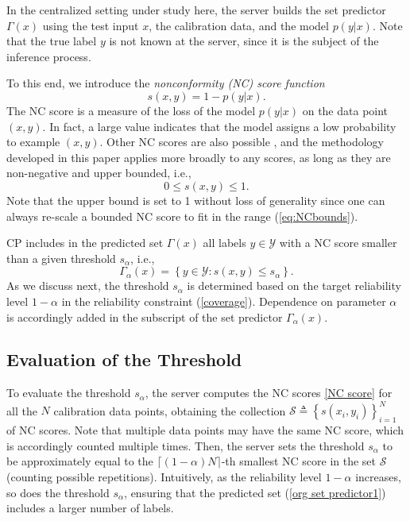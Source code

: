 \documentclass[12pt, draftclsnofoot, onecolumn]{IEEEtran}
\begin{document}
In the centralized setting under study here, the server builds the set predictor $\Gamma(x)$ using the test input $x$, the calibration data, and the model $p(y|x)$. Note that the true label $y$ is not known at the server, since it is the subject of the inference process. 


To this end, we introduce the \emph{nonconformity (NC) score function} 
\begin{equation}\label{NC score}
    s(x,y) = 1 - p(y|x).
\end{equation}
The NC score is a measure of the loss of the model $p(y|x)$ on the data point $(x,y)$. In fact, a large value indicates that the model assigns a low probability to example $(x,y)$. Other NC scores are also possible \cite{romano2020classification, wang2022probabilistic, teng2022predictive, chen2023spikecp}, and the methodology developed in this paper applies more broadly to any scores, as long as they are non-negative and upper bounded, i.e.,
\begin{equation}\label{eq:NCbounds}
    0\leq s(x,y)\leq 1.
\end{equation}
Note that the upper bound is set to 1 without loss of generality since one can always re-scale a bounded NC score to fit in the range (\ref{eq:NCbounds}).


CP includes in the predicted set $\Gamma(x)$ all labels $y\in \mathcal{Y}$ with a NC score smaller than a given threshold $s_\alpha$, i.e.,
\begin{equation}\label{org set predictor1}
    \Gamma_{\alpha}(x) = \left\{y\in\mathcal{Y}: {s}(x,y)\leq s_\alpha\right\}.
\end{equation}
As we discuss next, the threshold $s_\alpha$ is determined based on the target reliability level $1-\alpha$ in the reliability constraint (\ref{coverage}). Dependence on parameter $\alpha$ is accordingly added in the subscript of the set predictor $\Gamma_{\alpha}(x)$.

\subsection{Evaluation of the Threshold}
To evaluate the threshold $s_\alpha$, the server computes the NC scores \eqref{NC score} for all the $N$ calibration data points, obtaining the collection $\mathcal{S}\triangleq\left\{s(x_i,y_i)\right\}_{i=1}^N$ of NC scores. Note that multiple data points may have the same NC score, which is accordingly counted multiple times. Then, the server sets the threshold $s_\alpha$ to be approximately equal to the $\lceil(1-\alpha)N\rceil$-th smallest NC score in the set $\mathcal{S}$ (counting possible repetitions). Intuitively, as the reliability level $1-\alpha$ increases, so does the threshold $s_\alpha$, ensuring that the predicted set (\ref{org set predictor1}) includes a larger number of labels.
\end{document}
